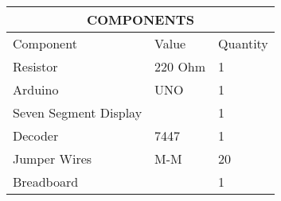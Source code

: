 \documentclass{article}
\begin{document}
\label{table:1}
\begin{tabular}{|p{5cm}|p{3cm}|p{2cm}|}
	\hline
	\multicolumn{3}{|c|}{COMPONENTS}\\
	\hline
	Component& Value& Quantity\\
	\hline
	Resistor &220 Ohm& 1\\
	\hline
	Arduino& UNO& 1\\
	\hline
	Seven Segment Display&  & 1\\              
	\hline                                     
	Decoder& 7447& 1\\                         
	\hline                                    
	Jumper Wires& M-M& 20\\                  
	\hline                                    
	Breadboard&  & 1\\                         
	\hline                                     
\end{tabular}
\end{document}
